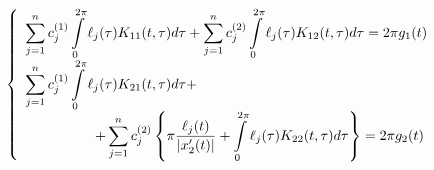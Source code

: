 \documentclass[14pt,a4paper]{extarticle}
\newcounter{e}
\numberwithin{equation}{section}
\newcommand{\intl}{\int\limits}
\newcommand{\inttwopi}{\intl_{0}^{2\pi}}
\begin{document}
 \begin{equation}
	 \label{coll-sys}
	 \left\{
	 \begin{array}{l}
	 	\displaystyle
	 	  \sum_{j=1}^{n} c^{(1)}_{j} \inttwopi \ell_{j}(\tau) K_{11}(t, \tau) d \tau
	 	+ \sum_{j=1}^{n} c^{(2)}_{j} \inttwopi \ell_{j}(\tau) K_{12}(t, \tau) d \tau
	 	= 2\pi g_{1}(t)
	 	\\ [0.3cm]
	 	
	 	\displaystyle
	 	  \sum_{j=1}^{n} c^{(1)}_{j} \inttwopi \ell_{j}(\tau) K_{21}(t, \tau) d \tau +
	 	\\ [0.3cm]
	 	
	 	\displaystyle
	 	\qquad \qquad \quad
	 	+ \sum_{j=1}^{n} c^{(2)}_{j} \left\{
	 	      \pi \frac{\ell_{j}(t)}{\abs{x'_{2}(t)}}
	 	    + \inttwopi \ell_{j}(\tau) K_{22}(t, \tau) d \tau
	 	  \right\}
	 	= 2\pi g_{2}(t)
	 \end{array}\right.
 \end{equation}
 
\end{document}
